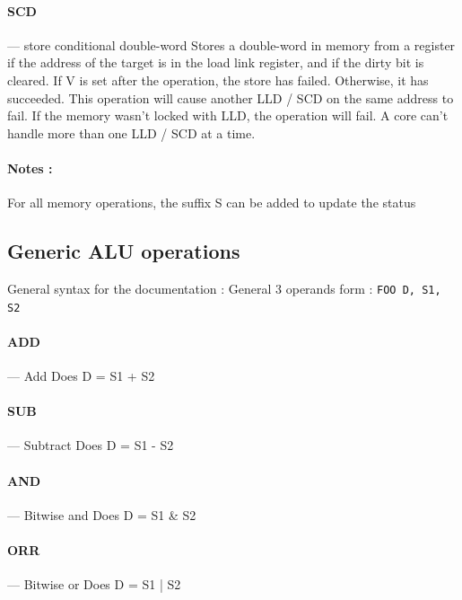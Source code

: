 \documentclass[11pt]{article}
\begin{document}
\paragraph{SCD} --- store conditional double-word\newline
Stores a double-word in memory from a register if the address of the target is
in the load link register, and if the dirty bit is cleared. If V is set after
the operation, the store has failed. Otherwise, it has succeeded. This
operation will cause another LLD / SCD on the same address to fail. If the
memory wasn't locked with LLD, the operation will fail. A core can't handle
more than one LLD / SCD at a time.

\paragraph{Notes : }
For all memory operations, the suffix S can be added to update the status

\subsection{Generic ALU operations}
General syntax for the documentation :
\newline
General 3 operands form : \texttt{FOO D, S1, S2}

\paragraph{ADD} --- Add\newline
Does \newline D = S1 + S2

\paragraph{SUB} --- Subtract\newline
Does \newline D = S1 - S2

\paragraph{AND} --- Bitwise and\newline
Does \newline D = S1 \& S2

\paragraph{ORR} --- Bitwise or\newline
Does \newline D = S1 | S2
\end{document}
